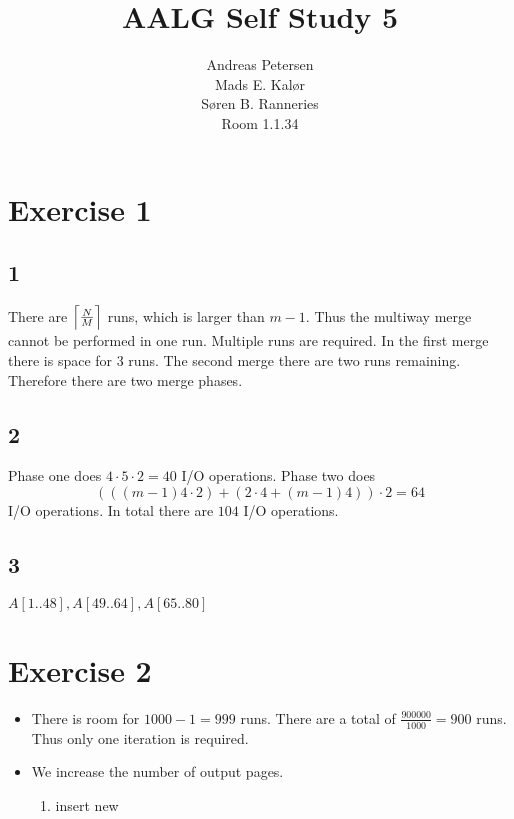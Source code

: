 \documentclass[koma,a4paper]{article}
\title{AALG Self Study 5}
\author{Andreas Petersen\\
Mads E. Kalør\\
Søren B. Ranneries\\
Room 1.1.34}
\DeclarePairedDelimiter{\ceil}{\lceil}{\rceil}
\begin{document}
\maketitle

\pagebreak

\section{Exercise 1}

\subsection{1}
There are $\ceil[\Big]{\frac{N}{M}}$ runs, which is larger than $m - 1$. Thus the multiway merge cannot be performed in one run. Multiple runs are required. In the first merge there is space for 3 runs. The second merge there are two runs remaining. Therefore there are two merge phases.

\subsection{2}
Phase one does $4 \cdot 5 \cdot 2 = 40$ I/O operations. Phase two does $$(((m - 1)4 \cdot 2) + (2 \cdot 4 + (m - 1) 4)) \cdot 2 = 64$$ I/O operations. In total there are $104$ I/O operations.

\subsection{3}
$A[1..48], A[49..64], A[65..80]$

\section{Exercise 2}
\begin{itemize}
  \item There is room for $1000-1 = 999$ runs. There are a total of $\frac{900000}{1000} = 900$ runs. Thus only one iteration is required.
  \item We increase the number of output pages.
  \begin{enumerate}
    \item insert new
  \end{enumerate}
\end{itemize}
\end{document}
